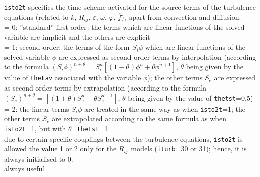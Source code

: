 {{\tt isto2t} specifies the time scheme
activated for the source terms of the turbulence equations (related to $k$,
$R_{ij}$, $\varepsilon$, $\omega$, $\varphi$, $\overline{f}$), apart
from convection and diffusion.\\
\hspace*{1.3cm}= 0: ''standard'' first-order: the terms which are linear
functions of the solved variable are implicit and the others are explicit\\
\hspace*{1.3cm}= 1: second-order: the terms of the form $S_i\phi$ which are
linear functions of the solved variable
$\phi$ are expressed as second-order terms by interpolation (according
to the formula
$(S_i\phi)^{n+\theta}=S_i^n[(1-\theta)\phi^n+\theta\phi^{n+1}]$, $\theta$
being given by the value of {\tt thetav} associated with the variable $\phi$);
the other terms $S_e$ are expressed as second-order terms by
extrapolation (according to the formula
$(S_e)^{n+\theta}=[(1+\theta)S_e^n-\theta S_e^{n-1}]$, $\theta$ being
given by the value of {\tt thetst}=0.5)\\
\hspace*{1.3cm}= 2: the linear terms $S_i\phi$ are treated in the same
way as when {\tt isto2t}=1;
the other terms $S_e$ are extrapolated according to the same formula
as when {\tt isto2t}=1, but with $\theta$={\tt thetst}=1\\
due to certain specific couplings between the turbulence equations,
{\tt isto2t} is allowed the value 1 or 2 only for the $R_{ij}$ models
({\tt iturb}=30 or 31); hence, it is always initialised to 0.\\
always useful}



